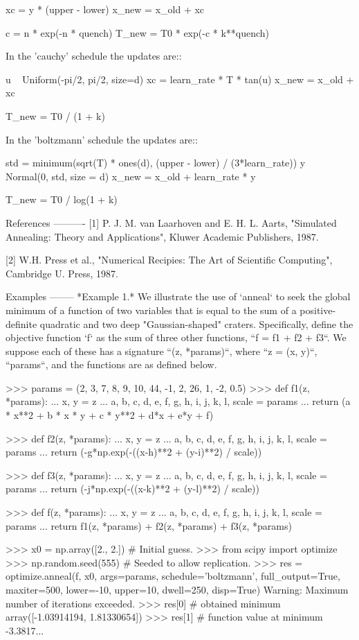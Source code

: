 \begin{DoxyVerb}
    xc = y * (upper - lower)
    x_new = x_old + xc

    c = n * exp(-n * quench)
    T_new = T0 * exp(-c * k**quench)

In the 'cauchy' schedule the updates are::

    u ~ Uniform(-pi/2, pi/2, size=d)
    xc = learn_rate * T * tan(u)
    x_new = x_old + xc

    T_new = T0 / (1 + k)

In the 'boltzmann' schedule the updates are::

    std = minimum(sqrt(T) * ones(d), (upper - lower) / (3*learn_rate))
    y ~ Normal(0, std, size = d)
    x_new = x_old + learn_rate * y

    T_new = T0 / log(1 + k)

References
----------
[1] P. J. M. van Laarhoven and E. H. L. Aarts, "Simulated Annealing: Theory
    and Applications", Kluwer Academic Publishers, 1987.

[2] W.H. Press et al., "Numerical Recipies: The Art of Scientific Computing",
    Cambridge U. Press, 1987.

Examples
--------
*Example 1.* We illustrate the use of `anneal` to seek the global minimum
of a function of two variables that is equal to the sum of a positive-
definite quadratic and two deep "Gaussian-shaped" craters.  Specifically,
define the objective function `f` as the sum of three other functions,
``f = f1 + f2 + f3``.  We suppose each of these has a signature
``(z, *params)``, where ``z = (x, y)``, ``params``, and the functions are
as defined below.

>>> params = (2, 3, 7, 8, 9, 10, 44, -1, 2, 26, 1, -2, 0.5)
>>> def f1(z, *params):
...     x, y = z
...     a, b, c, d, e, f, g, h, i, j, k, l, scale = params
...     return (a * x**2 + b * x * y + c * y**2 + d*x + e*y + f)

>>> def f2(z, *params):
...     x, y = z
...     a, b, c, d, e, f, g, h, i, j, k, l, scale = params
...     return (-g*np.exp(-((x-h)**2 + (y-i)**2) / scale))

>>> def f3(z, *params):
...     x, y = z
...     a, b, c, d, e, f, g, h, i, j, k, l, scale = params
...     return (-j*np.exp(-((x-k)**2 + (y-l)**2) / scale))

>>> def f(z, *params):
...     x, y = z
...     a, b, c, d, e, f, g, h, i, j, k, l, scale = params
...     return f1(z, *params) + f2(z, *params) + f3(z, *params)

>>> x0 = np.array([2., 2.])     # Initial guess.
>>> from scipy import optimize
>>> np.random.seed(555)   # Seeded to allow replication.
>>> res = optimize.anneal(f, x0, args=params, schedule='boltzmann',
                          full_output=True, maxiter=500, lower=-10,
                          upper=10, dwell=250, disp=True)
Warning: Maximum number of iterations exceeded.
>>> res[0]  # obtained minimum
array([-1.03914194,  1.81330654])
>>> res[1]  # function value at minimum
-3.3817...


\end{DoxyVerb}
